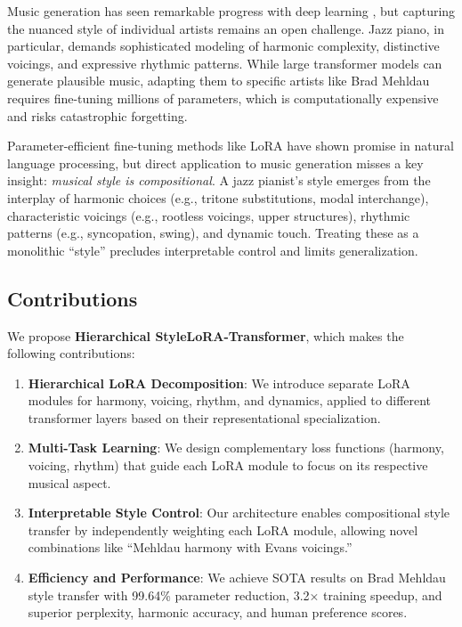 \documentclass{article}
\begin{document}
Music generation has seen remarkable progress with deep learning \cite{huang2018music, donahue2023musiclm, agostinelli2023musicgen}, but capturing the nuanced style of individual artists remains an open challenge. Jazz piano, in particular, demands sophisticated modeling of harmonic complexity, distinctive voicings, and expressive rhythmic patterns. While large transformer models can generate plausible music, adapting them to specific artists like Brad Mehldau requires fine-tuning millions of parameters, which is computationally expensive and risks catastrophic forgetting.

Parameter-efficient fine-tuning methods like LoRA \cite{hu2021lora} have shown promise in natural language processing, but direct application to music generation misses a key insight: \emph{musical style is compositional}. A jazz pianist's style emerges from the interplay of harmonic choices (e.g., tritone substitutions, modal interchange), characteristic voicings (e.g., rootless voicings, upper structures), rhythmic patterns (e.g., syncopation, swing), and dynamic touch. Treating these as a monolithic ``style'' precludes interpretable control and limits generalization.

\subsection{Contributions}

We propose \textbf{Hierarchical StyleLoRA-Transformer}, which makes the following contributions:

\begin{enumerate}
    \item \textbf{Hierarchical LoRA Decomposition}: We introduce separate LoRA modules for harmony, voicing, rhythm, and dynamics, applied to different transformer layers based on their representational specialization.

    \item \textbf{Multi-Task Learning}: We design complementary loss functions (harmony, voicing, rhythm) that guide each LoRA module to focus on its respective musical aspect.

    \item \textbf{Interpretable Style Control}: Our architecture enables compositional style transfer by independently weighting each LoRA module, allowing novel combinations like ``Mehldau harmony with Evans voicings.''

    \item \textbf{Efficiency and Performance}: We achieve SOTA results on Brad Mehldau style transfer with 99.64\% parameter reduction, 3.2× training speedup, and superior perplexity, harmonic accuracy, and human preference scores.
\end{enumerate}
\end{document}

